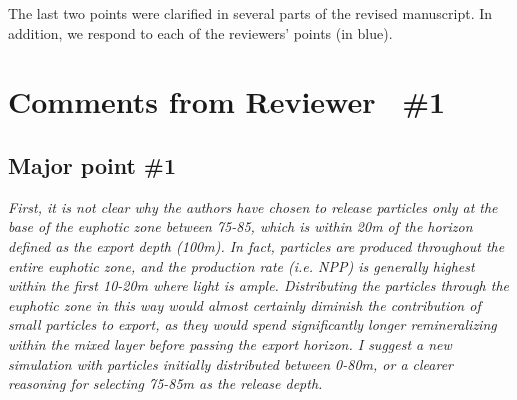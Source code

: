\documentclass[12pt,letter]{article}
\begin{document}
The last two points were clarified in several parts of the revised manuscript. In addition, we respond to each of the reviewers' points (in blue).

\section{Comments from Reviewer  \#1}
\subsection*{Major point \#1}
\small
\textit{First, it is not clear why the authors have chosen to release particles only at the base of the euphotic zone between 75-85, which is within 20m of the horizon defined as the export depth (100m). In fact, particles are produced throughout the entire euphotic zone, and the production rate (i.e. NPP) is generally highest within the first 10-20m where light is ample. Distributing the particles through the euphotic zone in this way would almost certainly diminish the contribution of small particles to export, as they would spend significantly longer remineralizing within the mixed layer before passing the export horizon. I suggest a new simulation with particles initially distributed between 0-80m, or a clearer reasoning for selecting 75-85m as the release depth.\\}
\end{document}
